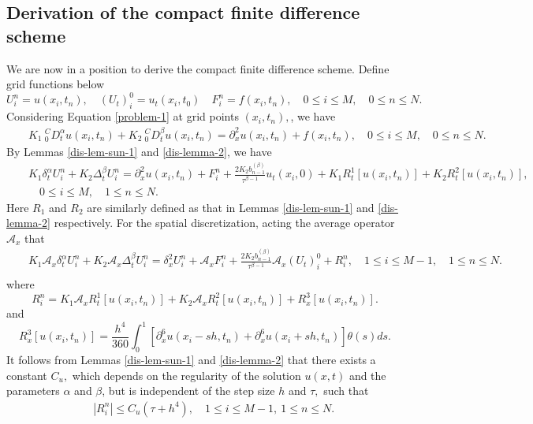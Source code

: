 \documentclass[11pt]{article}
\providecommand{\bh}[1]{#1}
\begin{document}
\bh{\subsection{Derivation of the compact finite difference scheme}
We are now in a position to derive the compact finite difference scheme.
Define grid functions below  
$$U_i^n=u(x_i,t_n), \quad (U_t)_i^0= u_t(x_i,t_0)\quad F_i^n=f(x_i,t_n),\quad 0\leq i\leq M,\quad 0\leq n\leq N. $$
Considering Equation \eqref{problem-1} at grid points  $ (x_i,t_n),$, we have
\begin{eqnarray}\label{eq-5}
&&K_1\  _0^{C}D_t^{\alpha}u(x_i,t_n)+K_2\  _0^{C}D_t^{\beta}u(x_i,t_n)=  \partial_x^2 u(x_i,t_n) +f(x_i,t_n),\quad 0\leq i\leq M,\quad 0\leq n\leq N.
\end{eqnarray}
By Lemmas \ref{dis-lem-sun-1} and \ref{dis-lemma-2}, we have
\begin{eqnarray}\label{eq-6}
&&K_1 \delta_t^{\alpha}U_i^n  +K_2 \Delta_t^{\beta} U_i^n= \partial_x^2u (x_i,t_n)+F_i^n+\frac{2K_2b_{n-1}^{(\beta)}}{\tau^{\beta-1}} u_t(x_i,0)+K_1R_t^1[u(x_i,t_n)]+K_2R_t^2[u(x_i,t_n)], \nonumber\\
&&\quad 0\leq i\leq M,\quad 1\leq n\leq N.
\end{eqnarray}
Here $R_1$ and $R_2$ are similarly  defined as that in Lemmas \ref{dis-lem-sun-1} and \ref{dis-lemma-2} respectively.
For the spatial  discretization, acting the average operator $\mathcal{A}_x$ that
\begin{eqnarray}\label{eq-7}
&&K_1 \mathcal{A}_x\delta_t^{\alpha}U_i^n  +K_2 \mathcal{A}_x\Delta_t^{\beta} U_i^n=  \delta_x^2 U_i^n+\mathcal{A}_xF_i^n+   \frac{2K_2b_{n-1}^{(\beta)}}{\tau^{\beta-1}} \mathcal{A}_x (U_t)_i^0+R_i^n, \quad 1\leq i\leq M-1,\quad 1\leq n\leq N.\nonumber \\
\end{eqnarray}
where
$$R_i^n=K_1\mathcal{A}_xR_t^1[u(x_i,t_n)]+K_2\mathcal{A}_xR_t^2[u(x_i,t_n)]+R_x^3[u(x_i,t_n)].$$
 and $$R_x^3[u(x_i,t_n)]=\frac{h^4}{360}\int_0^1[\partial_x^6u(x_i-sh,t_n)+\partial_x^6u(x_i+sh,t_n)]\theta (s)ds.$$
 It follows from Lemmas  \ref{dis-lem-sun-1} and \ref{dis-lemma-2}  that  there exists a constant  $C_u,$ which depends on the regularity of the solution $u(x,t)$ and the parameters $\alpha$ and $\beta$, but is independent of the step size $h$ and $\tau,$
such that
\begin{eqnarray}
&&|R_i^n|\leq C_u(\tau+h^4),\quad 1\leq i\leq M-1,~ 1\leq n\leq N.\label{truncation-error-1}
\end{eqnarray}
}
\end{document}

